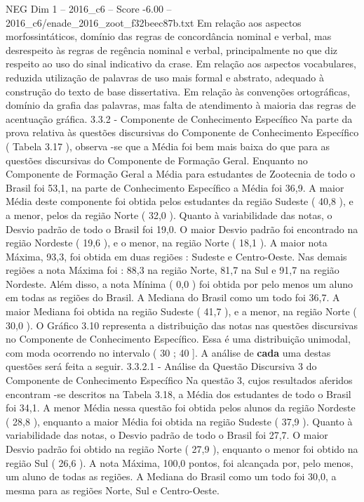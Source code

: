 \begin{textsample}{NEG Dim 1 – 2016\_c6 – Score -6.00 – 2016\_c6/enade\_2016\_zoot\_f32beec87b.txt}
Em relação aos aspectos morfossintáticos, domínio das regras de concordância nominal e verbal, mas desrespeito às regras de regência nominal e verbal, principalmente no que diz respeito ao uso do sinal indicativo da crase.
Em relação aos aspectos vocabulares, reduzida utilização de palavras de uso mais formal e abstrato, adequado à construção do texto de base dissertativa.
Em relação às convenções ortográficas, domínio da grafia das palavras, mas falta de atendimento à maioria das regras de acentuação gráfica. 3.3.2 - Componente de Conhecimento Específico Na parte da prova relativa às questões discursivas do Componente de Conhecimento Específico ( Tabela 3.17 ), observa -se que a Média foi bem mais baixa do que para as questões discursivas do Componente de Formação Geral.
Enquanto no Componente de Formação Geral a Média para estudantes de Zootecnia de todo o Brasil foi 53,1, na parte de Conhecimento Específico a Média foi 36,9.
A maior Média deste componente foi obtida pelos estudantes da região Sudeste ( 40,8 ), e a menor, pelos da região Norte ( 32,0 ).
Quanto à variabilidade das notas, o Desvio padrão de todo o Brasil foi 19,0.
O maior Desvio padrão foi encontrado na região Nordeste ( 19,6 ), e o menor, na região Norte ( 18,1 ).
A maior nota Máxima, 93,3, foi obtida em duas regiões : Sudeste e Centro-Oeste.
Nas demais regiões a nota Máxima foi : 88,3 na região Norte, 81,7 na Sul e 91,7 na região Nordeste.
Além disso, a nota Mínima ( 0,0 ) foi obtida por pelo menos um aluno em todas as regiões do Brasil.
A Mediana do Brasil como um todo foi 36,7.
A maior Mediana foi obtida na região Sudeste ( 41,7 ), e a menor, na região Norte ( 30,0 ).
O Gráfico 3.10 representa a distribuição das notas nas questões discursivas no Componente de Conhecimento Específico.
Essa é uma distribuição unimodal, com moda ocorrendo no intervalo ( 30 ; 40 ].
A análise de \textbf{cada} uma destas questões será feita a seguir. 3.3.2.1 - Análise da Questão Discursiva 3 do Componente de Conhecimento Específico Na questão 3, cujos resultados aferidos encontram -se descritos na Tabela 3.18, a Média dos estudantes de todo o Brasil foi 34,1.
A menor Média nessa questão foi obtida pelos alunos da região Nordeste ( 28,8 ), enquanto a maior Média foi obtida na região Sudeste ( 37,9 ).
Quanto à variabilidade das notas, o Desvio padrão de todo o Brasil foi 27,7.
O maior Desvio padrão foi obtido na região Norte ( 27,9 ), enquanto o menor foi obtido na região Sul ( 26,6 ).
A nota Máxima, 100,0 pontos, foi alcançada por, pelo menos, um aluno de todas as regiões.
A Mediana do Brasil como um todo foi 30,0, a mesma para as regiões Norte, Sul e Centro-Oeste.

\end{textsample}
